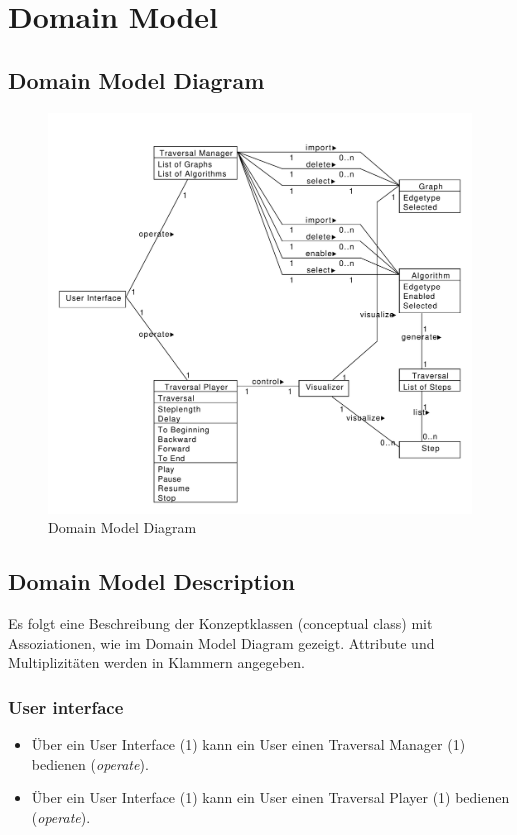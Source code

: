 \section{Domain Model}
\label{sec:domain_model}

\subsection{Domain Model Diagram}
\label{subsec:domain_model_diagram}
\begin{figure}[H]
    \includegraphics[totalheight=0.55\textheight]{diagrams/domain-model-diagram.pdf}
    \caption{Domain Model Diagram}
    \label{fig:domain_model_diagram}
\end{figure}

\newpage
\subsection{Domain Model Description}
\label{subsec:domain_model_description}
Es folgt eine Beschreibung der Konzeptklassen (conceptual class) mit Assoziationen, wie im Domain Model Diagram gezeigt. Attribute und Multiplizit\"aten werden in Klammern angegeben.

\subsubsection{User interface}
\label{subsubsec:User interface}
\begin{itemize}
  \item \"Uber ein User Interface (1) kann ein User einen Traversal Manager (1) bedienen (\textit{operate}).
  \item \"Uber ein User Interface (1) kann ein User einen Traversal Player (1) bedienen (\textit{operate}).
\end{itemize}
% 
